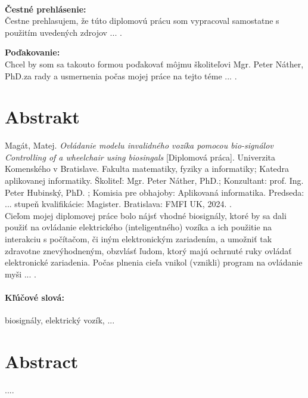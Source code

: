\documentclass[12pt, twoside]{book}
\def\mfnazov{Ovládanie modelu invalidného vozíka pomocou bio-signálov \\
\textit{Controlling of a wheelchair using biosingals}}
\def\mfskolitel{Mgr. Peter Náther, PhD.}
\newcommand\tab[1][1cm]{\hspace*{#1}}
\def\mfkonzultant{prof. Ing. Peter Hubinský, PhD. }
\begin{document}

\frontmatter
\begin{center}
\end{center}
\setcounter{page}{3}
\newpage 
~

\vfill
{\bf Čestné prehlásenie:} \\
{\tab[2cm] Čestne prehlasujem, že túto diplomovú prácu som vypracoval samostatne s použitím uvedených zdrojov ... .}
\newpage 
~

\vfill
{\bf Poďakovanie:}  \\
{\tab[2cm] Chcel by som sa takouto formou poďakovať môjmu školiteľovi \mfskolitel za rady a usmernenia počas mojej práce na tejto téme ... .}

\newpage 
\section*{Abstrakt}
Magát, Matej.   \textsl{\mfnazov}
[Diplomová práca]. Univerzita Komenského v Bratislave. Fakulta matematiky, fyziky a 
informatiky; Katedra aplikovanej informatiky. Školiteľ: \mfskolitel; Konzultant: \mfkonzultant; Komisia pre obhajoby: Aplikovaná informatika. Predseda: ... stupeň 
kvalifikácie: Magister. Bratislava: FMFI UK, 2024. .\\
\newline
\tab[5 mm] Cieľom mojej diplomovej práce bolo nájsť vhodné biosignály, ktoré by sa dali použiť na ovládanie elektrického (inteligentného) vozíka a ich použitie na interakciu s počítačom, či iným elektronickým zariadením, a umožniť tak zdravotne znevýhodneným, obzvlásť ľudom, ktorý majú ochrnuté ruky ovládať elektronické zariadenia. Počas plnenia cieľa vnikol (vznikli) program na ovládanie myši ... .\\

\vfill
\paragraph*{Kľúčové slová:} biosignály, elektrický vozík, ... 


\newpage 
\section*{Abstract}
....
\end{document}

